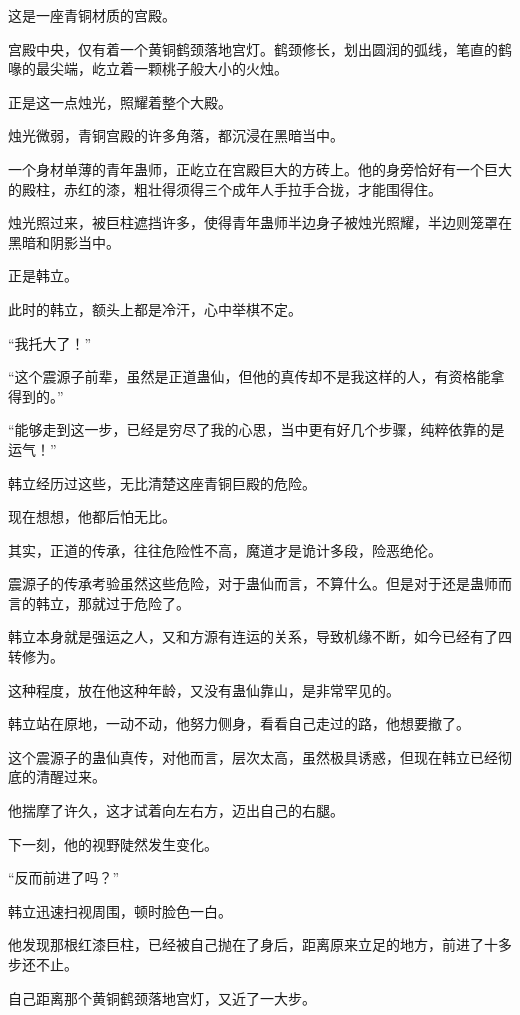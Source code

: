 
\begin{this_body}

这是一座青铜材质的宫殿。

宫殿中央，仅有着一个黄铜鹤颈落地宫灯。鹤颈修长，划出圆润的弧线，笔直的鹤喙的最尖端，屹立着一颗桃子般大小的火烛。

正是这一点烛光，照耀着整个大殿。

烛光微弱，青铜宫殿的许多角落，都沉浸在黑暗当中。

一个身材单薄的青年蛊师，正屹立在宫殿巨大的方砖上。他的身旁恰好有一个巨大的殿柱，赤红的漆，粗壮得须得三个成年人手拉手合拢，才能围得住。

烛光照过来，被巨柱遮挡许多，使得青年蛊师半边身子被烛光照耀，半边则笼罩在黑暗和阴影当中。

正是韩立。

此时的韩立，额头上都是冷汗，心中举棋不定。

“我托大了！”

“这个震源子前辈，虽然是正道蛊仙，但他的真传却不是我这样的人，有资格能拿得到的。”

“能够走到这一步，已经是穷尽了我的心思，当中更有好几个步骤，纯粹依靠的是运气！”

韩立经历过这些，无比清楚这座青铜巨殿的危险。

现在想想，他都后怕无比。

其实，正道的传承，往往危险性不高，魔道才是诡计多段，险恶绝伦。

震源子的传承考验虽然这些危险，对于蛊仙而言，不算什么。但是对于还是蛊师而言的韩立，那就过于危险了。

韩立本身就是强运之人，又和方源有连运的关系，导致机缘不断，如今已经有了四转修为。

这种程度，放在他这种年龄，又没有蛊仙靠山，是非常罕见的。

韩立站在原地，一动不动，他努力侧身，看看自己走过的路，他想要撤了。

这个震源子的蛊仙真传，对他而言，层次太高，虽然极具诱惑，但现在韩立已经彻底的清醒过来。

他揣摩了许久，这才试着向左右方，迈出自己的右腿。

下一刻，他的视野陡然发生变化。

“反而前进了吗？”

韩立迅速扫视周围，顿时脸色一白。

他发现那根红漆巨柱，已经被自己抛在了身后，距离原来立足的地方，前进了十多步还不止。

自己距离那个黄铜鹤颈落地宫灯，又近了一大步。


\end{this_body}

